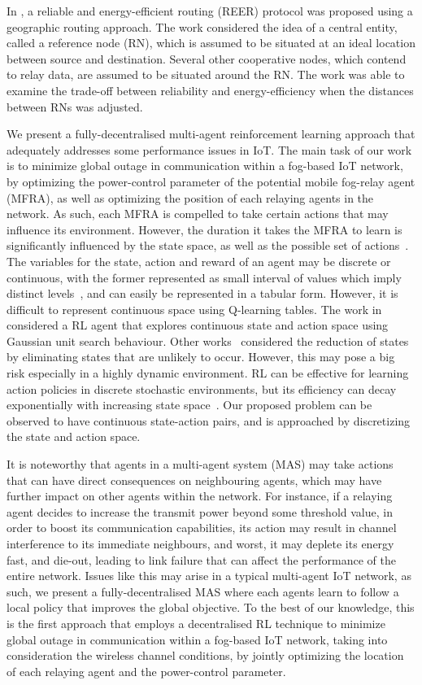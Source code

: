 \documentclass[journal]{IEEEtran}
\begin{document}
In \cite{Chen2008}, a reliable and energy-efficient routing (REER) protocol was proposed using a geographic routing approach. The work considered the idea of a central entity, called a reference node (RN), which is assumed to be situated at an ideal location between source and destination. Several other cooperative nodes, which contend to relay data, are assumed to be situated around the RN. The work was able to examine the trade-off between reliability and energy-efficiency when the distances between RNs was adjusted.


We present a fully-decentralised multi-agent reinforcement learning approach that adequately addresses some performance issues in IoT.
The main task of our work is to minimize global outage in communication within a fog-based IoT network, by optimizing the power-control parameter of the potential mobile fog-relay agent (MFRA), as well as optimizing the position of each relaying agents in the network. As such, each MFRA is compelled to take certain actions that may influence its environment. However, the duration it takes the MFRA to learn is significantly influenced by the state space, as well as the possible set of actions~\cite{Dusparic2009}. The variables for the state, action and reward of an agent may be discrete or continuous, with the former represented as small interval of values which imply distinct levels~\cite{Yau2012}, and can easily be represented in a tabular form. However, it is difficult to represent continuous space using Q-learning tables. The work in \cite{Vucevic2007} considered a RL agent that explores continuous state and action space using Gaussian unit search behaviour. Other works~\cite{Dusparic2009, Cuayahuitl2006} considered the reduction of states by eliminating states that are unlikely to occur. However, this may pose a big risk especially in a highly dynamic environment. RL can be effective for learning action policies in discrete stochastic environments, but its efficiency can decay exponentially with increasing state space~\cite{Uther1998}. Our proposed problem can be observed to have continuous state-action pairs, and is approached by discretizing the state and action space.

It is noteworthy that agents in a multi-agent system (MAS) may take actions that can have direct consequences on neighbouring agents, which may have further impact on other agents within the network. For instance, if a relaying agent decides to increase the transmit power beyond some threshold value, in order to boost its communication capabilities, its action may result in channel interference to its immediate neighbours, and worst, it may deplete its energy fast, and die-out, leading to link failure that can affect the performance of the entire network. Issues like this may arise in a typical multi-agent IoT network, as such, we present a fully-decentralised MAS where each agents learn to follow a local policy that improves the global objective. To the best of our knowledge, this is the first approach that employs a decentralised RL technique to minimize global outage in communication within a fog-based IoT network, taking into consideration the wireless channel conditions, by jointly optimizing the location of each relaying agent and the power-control parameter.
\end{document}

